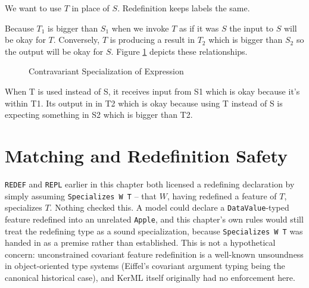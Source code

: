 We want to use $T$ in place of $S$.  Redefinition keeps labels the same.

Because $T_1$ is bigger than $S_1$ when we invoke $T$ as if it was $S$ the input to $S$ will be okay for $T$.
Conversely, $T$ is producing a result in $T_2$ which is bigger than $S_2$ so the output will be okay for $S$.
Figure \ref{fig:contra} depicts these relationships.

\begin{figure}[htbp]
\begin{center}
\caption{Contravariant Specialization of Expression}
\label{fig:contra}
\end{center}
\end{figure}

When T is used instead of S, it receives input from S1 which is okay because it's within T1.  Its output in in T2 which is okay because using T instead of S is expecting something in S2 which is bigger than T2.

\section{Matching and Redefinition Safety}\label{sec:match}

\texttt{REDEF} and \texttt{REPL} earlier in this chapter both licensed a redefining declaration by
simply assuming \texttt{Specializes W T} -- that $W$, having redefined a feature of $T$, specializes
$T$. Nothing checked this. A model could declare a \texttt{DataValue}-typed feature redefined into an
unrelated \texttt{Apple}, and this chapter's own rules would still treat the redefining type as a
sound specialization, because \texttt{Specializes W T} was handed in as a premise rather than
established. This is not a hypothetical concern: unconstrained covariant feature redefinition is a
well-known unsoundness in object-oriented type systems (Eiffel's covariant argument typing being the
canonical historical case), and KerML itself originally had no enforcement here.

